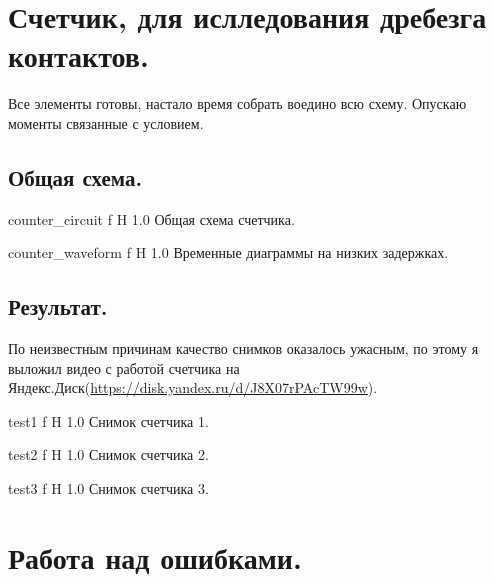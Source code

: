 \documentclass{bmstu}
\begin{document}
	\chapter{Счетчик, для ислледования дребезга контактов.}

	\begin{flushleft}
		Все элементы готовы, настало время собрать воедино всю схему. Опускаю моменты связанные с условием.
	\end{flushleft}
	
	\section{Общая схема.}

	{counter_circuit}
	{f} %
	{H} %
	{1.0\textwidth} %
	{Общая схема счетчика.} %
	
	{counter_waveform}
	{f} %
	{H} %
	{1.0\textwidth} %
	{Временные диаграммы на низких задержках.} %

	\section{Результат.}

	\begin{flushleft}
		По неизвестным причинам качество снимков оказалось ужасным, 
		по этому я выложил видео с работой счетчика на Яндекс.Диск(\underline{https://disk.yandex.ru/d/J8X07rPAcTW99w}).
	\end{flushleft}
	
	{test1}
	{f} %
	{H} %
	{1.0\textwidth} %
	{Снимок счетчика 1.} %
	
	{test2}
	{f} %
	{H} %
	{1.0\textwidth} %
	{Снимок счетчика 2.} %
	
	{test3}
	{f} %
	{H} %
	{1.0\textwidth} %
	{Снимок счетчика 3.} %
	\chapter{Работа над ошибками.}
	
\end{document}
